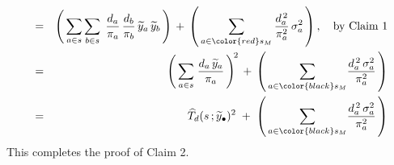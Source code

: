 \begin{enumerate}
\begin{eqnarray*}
    \\
    & = &
        \left(\,
            \underset{a \in s}{\sum}\,
            \underset{b \in s}{\sum}\;\,
            \dfrac{d_{a}}{\pi_{a}}\,
            \dfrac{d_{b}}{\pi_{b}}\,
            \widetilde{y}_{a}\,
            \widetilde{y}_{b}
            \,\right)
        \, + \,
        \left(\,
            \underset{a \in {\color{red}s_{M}}}{\sum}\,
            \dfrac{d_{a}^{\,2}}{\pi_{a}^{2}}\,
            \sigma^{2}_{a}
            \,\right),
        \quad
        \textnormal{by Claim 1}
    \\
    & = &
        \left(\,
            \underset{a \in s}{\sum}\;
            \dfrac{d_{a}\,\widetilde{y}_{a}}{\pi_{a}}
            \,\right)^{\!2}
        \, + \,
        \left(\,
            \underset{a \in {\color{black}s_{M}}}{\sum}
            \dfrac{d_{a}^{\,2}\,\sigma^{2}_{a}}{\pi_{a}^{2}}
            \,\right)
    \\
    & = &
        \widehat{T}_{d}(s\,;\widetilde{y}_{\bullet})^{2}
        \; + \;
        \left(\,
            \underset{a \in {\color{black}s_{M}}}{\sum}
            \dfrac{d_{a}^{\,2}\,\sigma^{2}_{a}}{\pi_{a}^{2}}
            \,\right)
    \end{eqnarray*}
    This completes the proof of Claim 2.


\end{enumerate}
